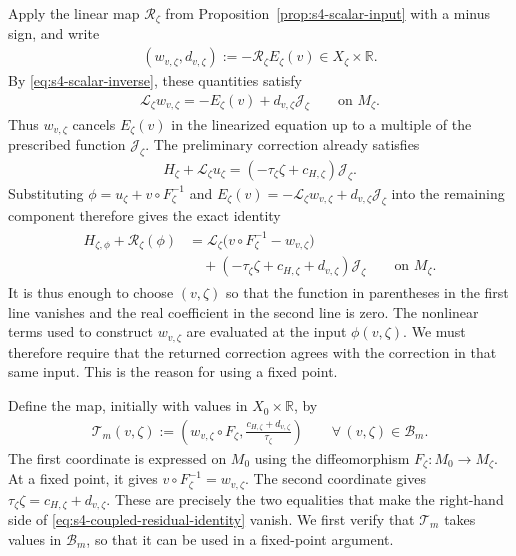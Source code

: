 \documentclass[a4paper,11pt,oneside,reqno]{amsart}
\numberwithin{equation}{section}
\theoremstyle{definition}
\begin{document}
Apply the linear map $\mathscr R_\zeta$ from
Proposition~\ref{prop:s4-scalar-input} with a minus sign, and write
%
\begin{align}
    \label{eq:s4-coupled-inverse-output}
    (w_{v,\zeta},d_{v,\zeta})
    :=-\mathscr R_\zeta E_\zeta(v)
    \in X_\zeta\times\mathbb R.
\end{align}
%
By \eqref{eq:s4-scalar-inverse}, these quantities satisfy
%
\begin{align}
    \label{eq:s4-coupled-linear-equation}
    \mathcal L_\zeta w_{v,\zeta}
    =-E_\zeta(v)+d_{v,\zeta}\mathcal J_\zeta
    \qquad\mbox{on }M_\zeta.
\end{align}
%
Thus $w_{v,\zeta}$ cancels $E_\zeta(v)$ in the linearized equation
up to a multiple of the prescribed function $\mathcal J_\zeta$.
The preliminary correction already satisfies
%
\begin{align*}
    H_\zeta+\mathcal L_\zeta u_\zeta
    =(-\tau_\zeta\zeta+c_{H,\zeta})\mathcal J_\zeta.
\end{align*}
%
Substituting $\phi=u_\zeta+v\circ F_\zeta^{-1}$ and
$E_\zeta(v)=-\mathcal L_\zeta w_{v,\zeta}
 +d_{v,\zeta}\mathcal J_\zeta$ into the remaining component
therefore gives the exact identity
%
\begin{align}
    \label{eq:s4-coupled-residual-identity}
    \begin{split}
        H_{\zeta,\phi}+\mathcal R_\zeta(\phi)
        &=\mathcal L_\zeta
            \bigl(v\circ F_\zeta^{-1}-w_{v,\zeta}\bigr)\\
        &\quad+
            (-\tau_\zeta\zeta+c_{H,\zeta}+d_{v,\zeta})
            \mathcal J_\zeta
            \qquad\text{on }M_\zeta.
    \end{split}
\end{align}
%
It is thus enough to choose $(v,\zeta)$ so that the function
in parentheses in the first line vanishes and the real
coefficient in the second line is zero. The nonlinear terms
used to construct $w_{v,\zeta}$ are evaluated at the input
$\phi(v,\zeta)$. We must therefore require that the returned
correction agrees with the correction in that same input.
This is the reason for using a fixed point.

Define the map, initially with values in $X_0\times\mathbb R$, by
%
\begin{align}
    \label{eq:s4-coupled-map}
    \mathcal T_m(v,\zeta):=
    \left(
        w_{v,\zeta}\circ F_\zeta,
        \frac{c_{H,\zeta}+d_{v,\zeta}}{\tau_\zeta}
    \right)
    \qquad\forall\,(v,\zeta)\in\mathcal B_m.
\end{align}
%
The first coordinate is expressed on $M_0$ using the diffeomorphism
$F_\zeta:M_0\to M_\zeta$. At a fixed point, it gives
$v\circ F_\zeta^{-1}=w_{v,\zeta}$. The second coordinate gives
$\tau_\zeta\zeta=c_{H,\zeta}+d_{v,\zeta}$.
These are precisely the two equalities that make the right-hand
side of \eqref{eq:s4-coupled-residual-identity} vanish.
We first verify that $\mathcal T_m$ takes values in
$\mathcal B_m$, so that it can be used in a fixed-point argument.
\end{document}
